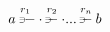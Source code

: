 
$\overset{r_1}{a \hspace{0.3em} \rightpitchfork \hspace{-0.35em} -  \cdot} \overset{r_2}{\rightpitchfork \hspace{-0.35em} -} \cdot ... \overset{r_n}{\rightpitchfork \hspace{-0.35em} -} b$
